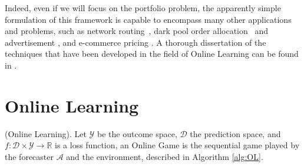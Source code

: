 Indeed, even if we will focus on the portfolio problem, the apparently simple formulation of this framework is capable to encompass many other applications and problems, such as network routing~\cite{belmega2018online}, dark pool order allocation~\cite{agarwal2010optimal} and advertisement \cite{gasparini2018targeting}, \cite{nuara2018combinatorial} and  e-commerce  pricing \cite{trovo2015multi} \cite{trovo2018improving}.
A thorough dissertation of the techniques that have been developed in the field of Online Learning can be found in \cite{cesa2006prediction}.

\section{Online Learning}
\label{sec:OnlineLearning}


\begin{definition}(Online Learning).\label{def:OGP}
    Let $\mathcal Y$ be the outcome space, $\mathcal D$ the prediction space, and $f:\mathcal D\times\mathcal Y\to \mathbb R$ is a loss function, an Online Game is the sequential game played by the forecaster $\mathcal A$ and the environment, described in Algorithm \ref{alg:OL}.
\end{definition}

